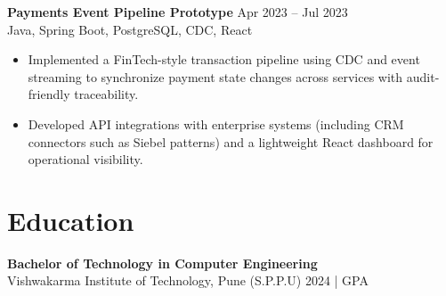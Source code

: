 \documentclass[10pt,letterpaper]{article}
\newcommand{\resumeSubheading}[4]{%
  \textbf{#1} \hfill #2 \\
  #3 \hfill #4 \\
}
\begin{document}
\resumeSubheading{Payments Event Pipeline Prototype}{Apr 2023 -- Jul 2023}{}{Java, Spring Boot, PostgreSQL, CDC, React}
\begin{itemize}
    \item Implemented a FinTech-style transaction pipeline using CDC and event streaming to synchronize payment state changes across services with audit-friendly traceability.
    \item Developed API integrations with enterprise systems (including CRM connectors such as Siebel patterns) and a lightweight React dashboard for operational visibility.
\end{itemize}

\section*{Education}
\resumeSubheading{Bachelor of Technology in Computer Engineering}{}{Vishwakarma Institute of Technology, Pune (S.P.P.U)}{2024 \enspace | \enspace 8.8 GPA}
\end{document}
